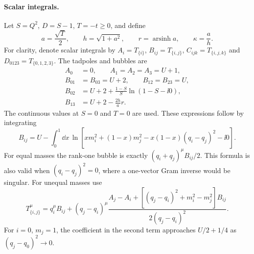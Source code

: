 \paragraph{Scalar integrals.}
Let $S=Q^2$, $D=S-1$, $T=-t\geq0$, and define
\begin{equation}
 a=\frac{\sqrt T}{2},\qquad h=\sqrt{1+a^2},\qquad
 r=\operatorname{arsinh}a,\qquad \kappa=\frac ah.
\end{equation}
For clarity, denote scalar integrals by
$A_i=T_{\{i\}}$, $B_{ij}=T_{\{i,j\}}$,
$C_{ijk}=T_{\{i,j,k\}}$ and $D_{0123}=T_{\{0,1,2,3\}}$.
The tadpoles and bubbles are
\begin{align}
 A_0&=0,\qquad A_1=A_2=A_3=U+1,\\
 B_{01}&=B_{03}=U+2,\qquad B_{12}=B_{23}=U,\\
 B_{02}&=U+2+\frac{1-S}{S}\ln(1-S-\ii0),\\
 B_{13}&=U+2-\frac{2h}{a}r.
 \label{eq:comp-supp-box-bubbles}
\end{align}
The continuous values at $S=0$ and $T=0$ are used.
These expressions follow by integrating
\begin{equation}
 B_{ij}=U-\int_0^1\dd x\,
 \ln\!\left[xm_i^2+(1-x)m_j^2
                    -x(1-x)(q_i-q_j)^2-\ii0\right].
\end{equation}
For equal masses the rank-one bubble is exactly
$(q_i+q_j)^\mu B_{ij}/2$. This formula is also valid when
$(q_i-q_j)^2=0$, where a one-vector Gram inverse would be
singular. For unequal masses use
\begin{equation}
 T_{\{i,j\}}^\mu=q_i^\mu B_{ij}
 +(q_j-q_i)^\mu
 \frac{A_j-A_i+[(q_j-q_i)^2+m_i^2-m_j^2]B_{ij}}
      {2(q_j-q_i)^2}.
\end{equation}
For $i=0$, $m_j=1$, the coefficient in the second term approaches
$U/2+1/4$ as $(q_j-q_0)^2\to0$.

